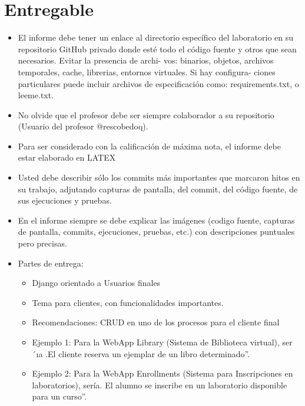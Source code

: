 \documentclass{article}
\begin{document}
    \section{Entregable}
    \begin{itemize}
        \item El informe debe tener un enlace al directorio específico del laboratorio en su repositorio GitHub
        privado donde esté todo el código fuente y otros que sean necesarios. Evitar la presencia de archi-
        vos: binarios, objetos, archivos temporales, cache, librerias, entornos virtuales. Si hay configura-
        ciones particulares puede incluir archivos de especificación como: requirements.txt, o leeme.txt.
        \item No olvide que el profesor debe ser siempre colaborador a su repositorio (Usuario del profesor
        @rescobedoq).
        \item Para ser considerado con la calificación de máxima nota, el informe debe estar elaborado en
        LATEX
        \item Usted debe describir sólo los commits más importantes que marcaron hitos en su trabajo,
        adjutando capturas de pantalla, del commit, del código fuente, de sus ejecuciones y pruebas.
        \item En el informe siempre se debe explicar las imágenes (codigo fuente, capturas de pantalla, commits,
        ejecuciones, pruebas, etc.) con descripciones puntuales pero precisas.
        \item Partes de entrega:
        \begin{itemize}
            \item Django orientado a Usuarios finales
            \item Tema para clientes, con funcionalidades importantes.
            \item Recomendaciones: CRUD en uno de los procesos para el cliente final
            \item Ejemplo 1: Para la WebApp Library (Sistema de Biblioteca virtual), ser´ıa .El cliente reserva un ejemplar de un libro determinado”.
            \item Ejemplo 2: Para la WebApp Enrollments (Sistema para Inscripciones en laboratorios), sería. El alumno se inscribe en un laboratorio disponible para un curso”.

        \end{itemize}
    \end{itemize}
\end{document}
